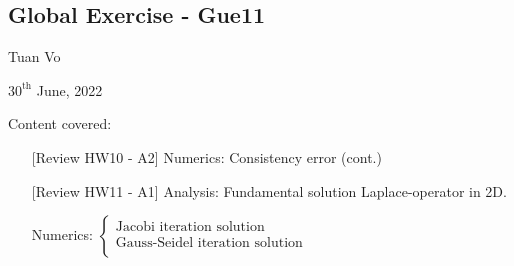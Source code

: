 \documentclass[12pt]{article}
\begin{document}
\begin{center}
	\section*{Global Exercise - Gue11}
\end{center}
\begin{center}
	Tuan Vo
\end{center}
\begin{center}
	$30^{\text{th}}$ June, 2022
\end{center}
Content covered:
\begin{itemize}
	\item[\checkmark] [Review HW10 - A2] Numerics: Consistency error (cont.)
	\item[\checkmark] [Review HW11 - A1] Analysis: Fundamental solution Laplace-operator in 2D.
	\item[\checkmark] Numerics:
	      $
		      \begin{cases}
			      \text{Jacobi iteration solution		}       \\
			      \text{Gauss-Seidel iteration solution		} \\
		      \end{cases}
	      $
\end{itemize}

\end{document}
